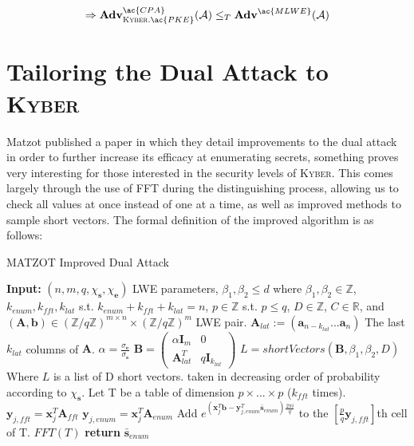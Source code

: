 \documentclass[a4paper, 10pt]{article}
\theoremstyle{definition}
\begin{document}
\[ \Rightarrow \mathbf{Adv}^{\ac{CPA}}_{\textsc{Kyber}.\ac{PKE}}(\mathcal{A}) \leq_T \mathbf{Adv}^{\ac{MLWE}}(\mathcal{A}) \]

\section{Tailoring the Dual Attack to \textsc{Kyber}}

Matzot published a paper in which they detail improvements to the dual attack in order to further increase its efficacy at enumerating secrets, something proves very interesting for those interested in the security levels of \textsc{Kyber}. This comes largely through the use of \ac{FFT} during the distinguishing process, allowing us to check all values at once instead of one at a time, as well as improved methods to sample short vectors. The formal definition of the improved algorithm is as follows:


\begin{algorithm}[H]
    \caption{MATZOT Improved Dual Attack}
    \begin{algorithmic}[1]
    \State \textbf{Input:} $(n,m,q,\chi _{\mathbf{s}}, \chi _{\mathbf{e}})$ LWE parameters, $\beta _1, \beta _2 \leq d$ where $\beta _1, \beta _2 \in \mathbb{Z}$, $k_{enum}, k_{fft}, k_{lat}$ s.t. $k_{enum} + k_{fft} + k_{lat} = n$, $p \in \mathbb{Z}$ s.t. $p \leq q$, $D \in \mathbb{Z}$, $C \in \mathbb{R}$, and $(\mathbf{A, b})\in (\mathbb{Z}/q\mathbb{Z})^{m \times n} \times (\mathbb{Z}/q\mathbb{Z})^m$ LWE pair.
    \State
    \State $\mathbf{A}_{lat} := (\mathbf{a}_{n-k_{lat}}...\mathbf{a}_n)$ \Comment The last $k_{lat}$ columns of $\mathbf{A}$.
    \State $\alpha = \frac{\sigma _\mathbf{e}}{\sigma _\mathbf{s}}$
    \State $\mathbf{B} = 
        \begin{pmatrix}
            \alpha \mathbf{I}_m & 0\\
            \mathbf{A}^T_{lat} & q \mathbf{I}_{k_{lat}}
        \end{pmatrix}$
    \State $L = shortVectors(\mathbf{B}, \beta _1, \beta _2, D)$ \Comment Where $L$ is a list of D short vectors.
     \Comment taken in decreasing order of probability according to $\chi _\mathbf{s}$.
        \State Let T be a table of dimension $p \times ... \times p$ ($k_{fft}$ times).
        \State $\mathbf{y}_{j, fft} = \mathbf{x}^T_j \mathbf{A}_{fft}$
        \State $\mathbf{y}_{j, enum} = \mathbf{x}^T_j \mathbf{A}_{enum}$
        \State Add $e^{(\mathbf{x}^T_j\mathbf{b}-\mathbf{y}^T_{j, enum}\bar{\mathbf{s}}_{enum})\frac{2\pi i}{q}}$ to the $[\frac{p}{q}\mathbf{y}_{j, fft}]$th cell of T.
        \EndFor
    $FFT(T)$
        \State \textbf{return} $\bar{\mathbf{s}}_{enum}$
    \EndIf
    \EndFor
    
    \end{algorithmic}
\end{algorithm}
\end{document}
